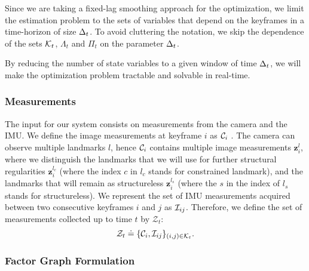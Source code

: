 Since we are taking a fixed-lag smoothing approach for the optimization, we limit the estimation problem to the sets of variables that depend on the keyframes in a time-horizon of size $\Delta_t$.
To avoid cluttering the notation, we skip the dependence of the sets $\calK_t$, $\Lambda_t$ and $\Pi_t$ on the parameter $\Delta_t$.

By reducing the number of state variables to a given window of time $\Delta_t$, we will make the optimization problem tractable and solvable in real-time.

\subsubsection{Measurements}
\label{sssec:measurements}

The input for our system consists on measurements from the camera and the IMU.
We define the image measurements at keyframe $i$ as $\mathcal{C}_i$ .
The camera can observe multiple landmarks $l$, hence $\mathcal{C}_i$ contains multiple image measurements $\mathbf{z}_{i}^{l}$,
 where we distinguish the landmarks that we will use for further structural regularities $\mathbf{z}_{i}^{l_{c}}$ (where the index $c$ in $l_c$ stands for constrained landmark),
  and the landmarks that will remain as structureless $\mathbf{z}_{i}^{l_s}$ (where the $s$ in the index of $l_s$ stands for structureless).
We represent the set of IMU measurements acquired between two consecutive keyframes $i$ and $j$ as  $\mathcal{I}_{ij}$.
Therefore, we define the set of measurements collected up to time $t$ by $\mathcal{Z}_t$:
\begin{equation}
  \mathcal{Z}_t \doteq \{\meascam_i, \measimu_\subimu\}_{\indmeas \in \mathcal{K}_t}.
  \label{eq:measurements}
\end{equation}


\subsubsection{Factor Graph Formulation}
\label{sssec:factor_graph}

